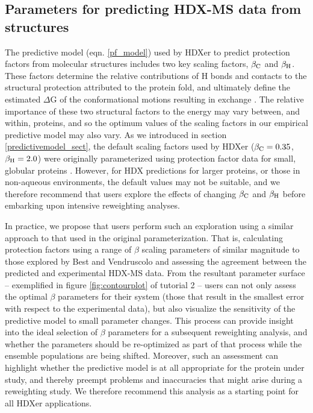 \documentclass[9pt,tutorial]{livecoms}
\begin{document}
\subsection{Parameters for predicting HDX-MS data from structures}\label{choosingbetaparams_sect}
The predictive model (eqn. \ref{pf_model}) used by HDXer to predict protection factors from molecular structures includes two key scaling factors, $\beta_\textnormal{C}$ and $\beta_\textnormal{H}$.
These factors determine the relative contributions of H bonds and contacts to the structural protection attributed to the protein fold, and ultimately define the estimated $\Delta$G of the conformational motions resulting in exchange \cite{VendruscoloPaci2003, BestVendruscolo2006}.
The relative importance of these two structural factors to the energy may vary between, and within, proteins, and so the optimum values of the scaling factors in our empirical predictive model may also vary.
As we introduced in section \ref{predictivemodel_sect}, the default scaling factors used by HDXer ($\beta_\textnormal{C} = 0.35$, $\beta_\textnormal{H} = 2.0$) were originally parameterized using protection factor data for small, globular proteins \cite{BestVendruscolo2006}.
However, for HDX predictions for larger proteins, or those in non-aqueous environments, the default values may not be suitable, and we therefore recommend that users explore the effects of changing $\beta_\textnormal{C}$ and $\beta_\textnormal{H}$ before embarking upon intensive reweighting analyses.

In practice, we propose that users perform such an exploration using a similar approach to that used in the original parameterization.
That is, calculating protection factors using a range of $\beta$ scaling parameters of similar magnitude to those explored by Best and Vendruscolo and assessing the agreement between the predicted and experimental HDX-MS data.
From the resultant parameter surface -- exemplified in figure \ref{fig:contourplot} of tutorial 2 -- users can not only assess the optimal $\beta$ parameters for their system (those that result in the smallest error with respect to the experimental data), but also visualize the sensitivity of the predictive model to small parameter changes.
This process can provide insight into the ideal selection of $\beta$ parameters for a subsequent reweighting analysis, and whether the parameters should be re-optimized as part of that process while the ensemble populations are being shifted.
Moreover, such an assessment can highlight whether the predictive model is at all appropriate for the protein under study, and thereby preempt problems and inaccuracies that might arise during a reweighting study.
We therefore recommend this analysis as a starting point for all HDXer applications.
\end{document}
